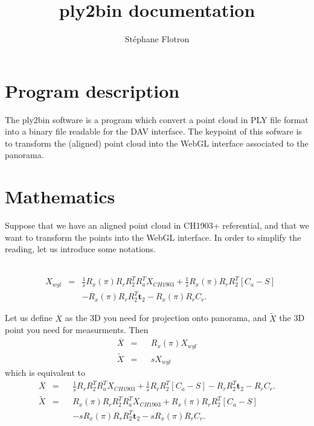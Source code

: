 \documentclass[a4paper, 11pt]{article}
\author{ St\'ephane Flotron }
\title{\textbf{ply2bin documentation}}
\renewcommand{\tilde}{\widetilde}
\renewcommand{\t}{\mathbf{t}}
\begin{document}
   \maketitle
   
   \section*{Program description}
   
   The ply2bin software is a program which convert a point cloud in PLY file format into 
   a binary file readable for the DAV interface. 
   The keypoint of this sofware is to transform the (aligned) point cloud into the WebGL
   interface associated to the panorama.
   
   \section*{Mathematics}
   
   Suppose that we have an aligned point cloud in CH1903+ referential, and that we want to transform the points into
   the WebGL interface. In order to simplify the reading, let us introduce some notations.
   
   \begin{tabular}{cc}
        
   \end{tabular}
   
   \begin{equation}
       \begin{aligned}
           & X_{wgl} & = & \frac{1}{s} R_x(\pi) R_r R_2^T R_a^T X_{CH1903} + \frac{1}{s} R_x(\pi) R_r R_2^T [C_a -S] \\
            &&&       -R_x(\pi) R_r R_2^T \t_2 - R_x(\pi) R_r C_r.
       \end{aligned}
   \end{equation} 
   
   Let us define $\overline X $ as the 3D you need for projection onto panorama, and $\tilde X$ the 3D point you need 
   for measurments. Then 
   \begin{equation}
        \begin{aligned}
        \overline X & = && R_x(\pi) X_{wgl} \\
        \tilde X & = && s X_{wgl}
        \end{aligned}
   \end{equation}
   which is equivalent to 
      \begin{equation}
        \begin{aligned}
        \overline X & = && \frac{1}{s} R_r R_2^T R_a^T X_{CH1903} + \frac{1}{s} R_r R_2^T [C_a -S] -R_r R_2^T \t_2 - R_r C_r. \\
        \tilde X & = && R_x(\pi) R_r R_2^T R_a^T X_{CH1903} + R_x(\pi) R_r R_2^T [C_a -S] \\
            &&&       -s R_x(\pi) R_r R_2^T \t_2 - s R_x(\pi) R_r C_r.
        \end{aligned}
   \end{equation}
\end{document}
